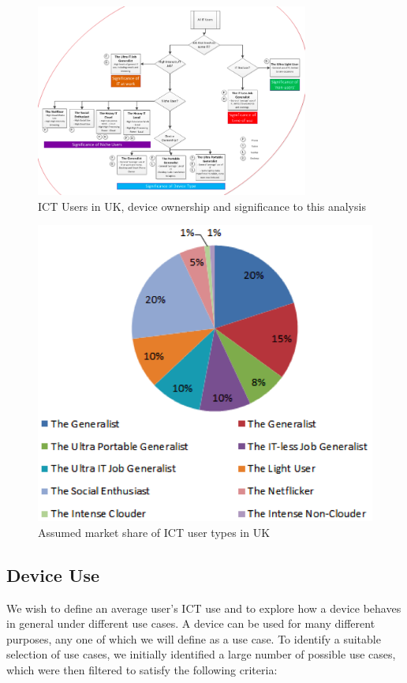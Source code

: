 \documentclass[conference]{IEEEtran}
\begin{document}
\begin{figure}
\centering
\includegraphics[width=0.8\textwidth]{images/ukitusers_ownership_signif.png}
\caption{ICT Users in UK, device ownership and significance to this analysis}
\label{fig:itusersuk} 
\end{figure}

\begin{figure}
\centering
\includegraphics[width=0.9\columnwidth]{images/ukitusers_marketshare.png}
\caption{Assumed market share of ICT user types in UK}
\label{fig:marketshare} 
\end{figure}


\subsection{Device Use}

We wish to define an average user's ICT use and to explore how a
device behaves in general under different use cases.  A device can be
used for many different purposes, any one of which we will define as a
use case.  To identify a suitable selection of use cases, we initially
identified a large number of possible use cases, which were then
filtered to satisfy the following criteria:
\end{document}
